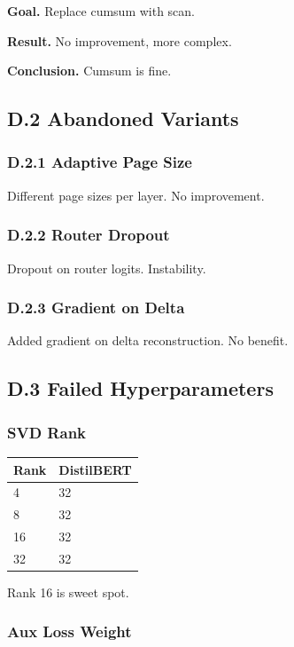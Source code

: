 \textbf{Goal.} Replace cumsum with scan.

\textbf{Result.} No improvement, more complex.

\textbf{Conclusion.} Cumsum is fine.

\subsection{D.2 Abandoned Variants}

\subsubsection{D.2.1 Adaptive Page Size}

Different page sizes per layer. No improvement.

\subsubsection{D.2.2 Router Dropout}

Dropout on router logits. Instability.

\subsubsection{D.2.3 Gradient on Delta}

Added gradient on delta reconstruction. No benefit.

\subsection{D.3 Failed Hyperparameters}

\subsubsection{SVD Rank}

\begin{table}[H]
\centering
\small
\begin{tabular}{ll}
\toprule
\textbf{Rank} & \textbf{DistilBERT} \\
\midrule
4 & 32 \\
8 & 32 \\
16 & 32 \\
32 & 32 \\
\bottomrule
\end{tabular}
\end{table}

Rank 16 is sweet spot.

\subsubsection{Aux Loss Weight}

